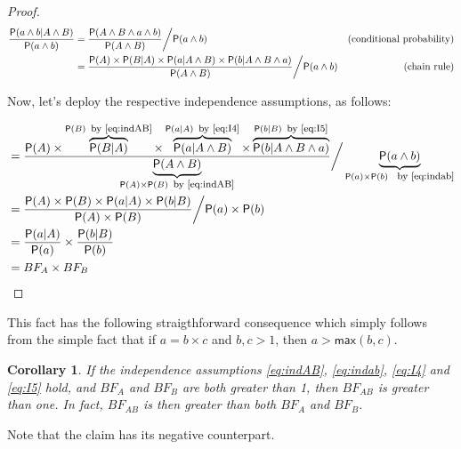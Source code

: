 \documentclass[
  10pt,
  dvipsnames,enabledeprecatedfontcommands]{scrartcl}
\newcommand{\et}{\wedge}
\newcommand{\pr}[1]{\ensuremath{\mathsf{P}(#1)}}
\newtheorem{corollary}{Corollary}[fact]
\begin{document}
\begin{proof}

\begin{align*}
\frac{\pr{a \wedge b\vert A\wedge B}}{\pr{a \wedge b}} & = \frac{\pr{A \et B\et a\wedge b}}{\pr{A \et B}} \bigg/ \pr{a \wedge b}
&\mbox{(conditional probability)} \\
&  = \frac{\pr{A} \times \pr {B \vert A}  \times \pr{a \vert A \et B} \times \pr{b \vert A \et B \et a}}{\pr{A \et B}} \bigg/ \pr{a \wedge b}
&\mbox{\,\,\,\,\,\,\, (chain rule)} \\
\end{align*}

\noindent Now, let's deploy the respective independence assumptions, as follows:

\begin{align*}
&  = \frac{\pr{A} \times \overbrace{\pr {B \vert A}}^{ \pr{B} \mbox{\footnotesize \, by \eqref{eq:indAB}}}  \times
\overbrace{\pr{a \vert A \et B}}^{\pr{a \vert A} \mbox{\footnotesize \, by \eqref{eq:I4}}}
\times \overbrace{\pr{b \vert A \et B \et a}}^{\pr{b \vert B} \mbox{\footnotesize \, by \eqref{eq:I5}}}
}{\underbrace{\pr{A \et B}}_{\pr{A} \times \pr{B} \mbox{\footnotesize \, by \eqref{eq:indAB}}}} \bigg/ \underbrace{\pr{a \wedge b}}_{\pr{a}\times \pr{b} \mbox{ \footnotesize \, by \eqref{eq:indab}}} \\
&  = \frac{\pr{A} \times  \pr{B}   \times \pr{a \vert A}  \times  \pr{b \vert B}}
{\pr{A} \times \pr{B}} \bigg/ \pr{a}\times \pr{b} \\
& = \frac{\pr{a \vert A}  }{\pr{a}}  \times \frac{\pr{b \vert B}}{\pr{b}} \\
& = BF_{A} \times BF_B
\end{align*}

\end{proof}

This fact has the following straigthforward consequence which simply
follows from the simple fact that if \(a = b \times c\) and \(b, c>1\),
then \(a > \mathsf{max}(b,c)\).

\begin{corollary} If the independence assumptions \eqref{eq:indAB}, \eqref{eq:indab}, \eqref{eq:I4} and \eqref{eq:I5} hold, and $BF_{A}$ and $BF_{B}$ are both greater than 1, then $BF_{AB}$ is greater than one. In fact,  $BF_{AB}$ is then greater than both  $BF_{A}$ and $BF_{B}$. \label{cor:BFind2}
\end{corollary}

Note that the claim has its negative counterpart.
\end{document}
